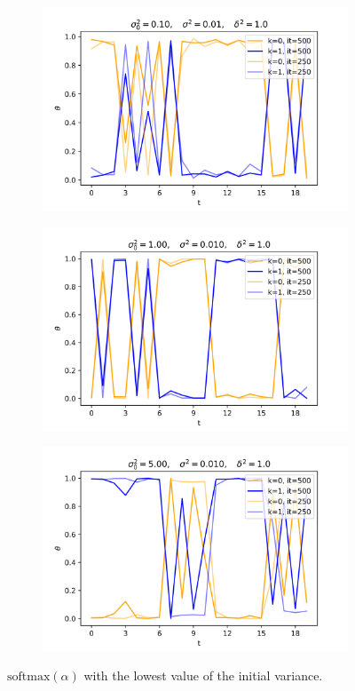 \documentclass[12pt]{article}
\begin{document}
\begin{figure}[H]
  \begin{subfigure}[b]{0.33\textwidth}
    \includegraphics[width=\linewidth]{init_1E-01|basic_1E-02|prop_1E+00|it_500}
  \end{subfigure}%
  \begin{subfigure}[b]{0.33\textwidth}
    \includegraphics[width=\linewidth]{init_1E+00|basic_1E-02|prop_1E+00|it_500}
  \end{subfigure}%
  \begin{subfigure}[b]{0.33\textwidth}
    \includegraphics[width=\linewidth]{init_5E+00|basic_1E-02|prop_1E+00|it_500}
  \end{subfigure}
  \caption{$\mbox{softmax}(\alpha)$ with the lowest value of the initial variance.}\label{fig:animals}
\end{figure}
\end{document}
